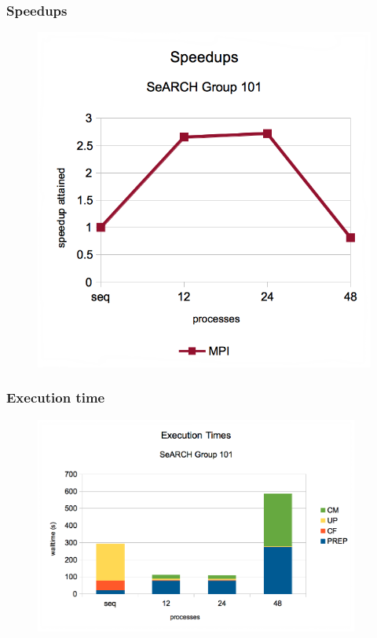 \documentclass{beamer}
\begin{document}
\begin{frame}
	\frametitle{Speedups}
	\begin{figure}
		\begin{center}
			\includegraphics[height=0.85\textheight]{images/may/speedups.png}
		\end{center}
	\end{figure}
\end{frame}




\begin{frame}
	\frametitle{Execution time}
	\begin{figure}
		\begin{center}
			\includegraphics[width=0.95\textwidth]{images/may/exectime.png}
		\end{center}
	\end{figure}
\end{frame}
\end{document}
